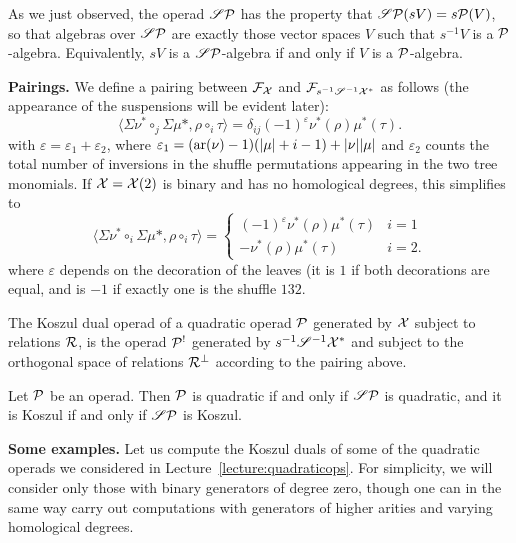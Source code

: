 \begin{note} As we just observed,
the operad  $\mathscr{S}{\mathcal{P}}$ has the property that
$\mathscr{S}{\mathcal{P}}(sV) = s{\mathcal{P}}(V)$, so that algebras over $\mathscr{S}{\mathcal{P}}$
are exactly those vector spaces $V$ such that $s^{-1}V$ is a
${\mathcal{P}}$-algebra. Equivalently, $sV$ is a $\mathscr{S}{\mathcal{P}}$-algebra
if and only if $V$ is a ${\mathcal{P}}$-algebra. 
\end{note}

\textbf{Pairings.} We define a pairing between $\mathcal{F}_{\mathcal{X}}$ and
$\mathcal{F}_{s^{-1}\mathscr{S}^{-1}\mathcal{X}^*}$ as follows (the appearance of
the suspensions will be evident later):
\[ \langle \Sigma\nu^* \circ_j \Sigma\mu*, 
	\rho \circ_i \tau  \rangle
   = \delta_{ij} (-1)^{\varepsilon}
   	\nu^*(\rho)\mu^*(\tau). \]
with $\varepsilon = \varepsilon_1+\varepsilon_2$,
where $\varepsilon_1 = (\operatorname{ar}(\nu)-1)(|\mu|+i-1)+|\nu||\mu|$ 
and $\varepsilon_2$ counts the total
number of inversions in the shuffle permutations
appearing in the two tree monomials.
If $\mathcal{X} = \mathcal{X}(2)$ is binary and has no homological degrees, 
this simplifies to
\[ \langle \Sigma\nu^* \circ_i \Sigma\mu*, 
	\rho \circ_i \tau  \rangle
   =  \begin{cases}
    	(-1)^\varepsilon \nu^*(\rho)\mu^*(\tau) & i=1 \\
    	-	\nu^*(\rho)\mu^*(\tau) & i = 2.
    	\end{cases} \] 
where $\varepsilon$ depends on the decoration
of the leaves (it is $1$ if both decorations
are equal, and is $-1$ if exactly one is the
shuffle $132$. 

\begin{definition}
The Koszul dual operad of a quadratic operad ${\mathcal{P}}$ 
generated by $\mathcal{X}$ subject to relations $\mathcal{R}$, is
the operad ${\mathcal{P}}^!$ generated by $s^{-1}\mathscr{S}^{-1}\mathcal{X}^*$ 
and subject to the orthogonal space of relations
$\mathcal{R}^\perp$ according to the pairing above.
\end{definition} 

\begin{note}
Let ${\mathcal{P}}$ be an operad. Then ${\mathcal{P}}$ is quadratic if and
only if $\mathscr{S}{\mathcal{P}}$ is quadratic, and it is Koszul if and
only if $\mathscr{S}{\mathcal{P}}$ is Koszul. 
\end{note}

\textbf{Some examples.} Let us compute the Koszul duals of 
some of the quadratic operads we considered in 
Lecture~\ref{lecture:quadraticops}.
For simplicity, we will consider only those with binary 
generators of degree zero, though one can in the same way
carry out computations with generators of higher arities and
varying homological degrees.

